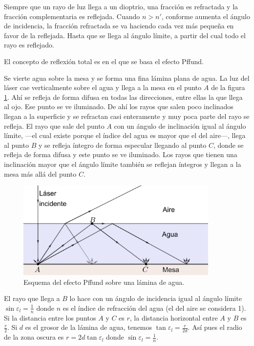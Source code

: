 \documentclass[12pt]{article}
\numberwithin{table}{section}
\numberwithin{figure}{section}
\numberwithin{equation}{section}
\DeclareMathOperator{\sen}{sin}
\begin{document}
Siempre que un rayo de luz llega a un dioptrio, una fracción es refractada y la fracción complementaria es reflejada. Cuando $n>n'$, conforme aumenta el ángulo de incidencia, la fracción refractada se va haciendo cada vez más pequeña en favor de la reflejada. Hasta que se llega al ángulo límite, a partir del cual todo el rayo es reflejado.

El concepto de reflexión total es en el que se basa el efecto Pffund.

Se vierte agua sobre la mesa y se forma una fina lámina plana de agua. La luz del láser cae verticalmente sobre el agua y llega a la mesa en el punto $A$ de la figura \ref{P2PffAgua}. Ahí se refleja de forma difusa en todas las direcciones, entre ellas la que llega al ojo. Ese punto se ve iluminado. De ahí los rayos que salen poco inclinados llegan a la superficie y se refractan casi enteramente y muy poca parte del rayo se refleja. El rayo que sale del punto $A$ con un ángulo de inclinación igual al ángulo límite, ---el cual existe porque el índice del agua es mayor que el del aire---, llega al punto $B$ y se refleja íntegro de forma especular llegando al punto $C$, donde se refleja de forma difusa y este punto se ve iluminado. Los rayos que tienen una inclinación mayor que el ángulo límite también se reflejan íntegros y llegan a la mesa más allá del punto $C$.

\begin{figure}[!ht]
	\small \centering \sffamily
	\begin{center}
		\includegraphics[width=10cm]{P2PffAgua.png}
		\caption{Esquema del efecto Pffund sobre una lámina de agua.}
		\label{P2PffAgua}
	\end{center}
\end{figure}

El rayo que llega a $B$ lo hace con un ángulo de incidencia igual al ángulo límite $\sen\varepsilon_l=\frac{1}{n}$ donde $n$ es el índice de refracción del agua (el del aire se considera 1). Si la distancia entre los puntos $A$ y $C$ es $r$, la distancia horizontal entre $A$ y $B$ es $\frac{r}{2}$. Si $d$ es el grosor de la lámina de agua, tenemos $\tan\varepsilon_l=\frac{r}{2d}$. Así pues el radio de la zona oscura es $r=2d\tan\varepsilon_l$ donde $\sen\varepsilon_l=\frac{1}{n}$.
\end{document}
